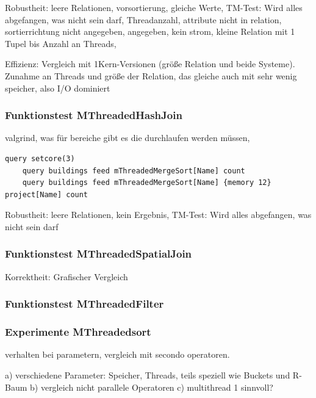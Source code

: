 \documentclass[a4paper,12pt,twoside]{article}
\begin{document}
Robustheit: leere Relationen, vorsortierung, gleiche Werte, TM-Test: Wird alles abgefangen, was nicht sein darf, Threadanzahl, attribute nicht in relation, sortierrichtung nicht angegeben, angegeben, kein strom, kleine Relation mit 1 Tupel bis Anzahl an Threads,


Effizienz: Vergleich mit 1Kern-Versionen (größe Relation und beide Systeme). Zunahme an Threads und größe der Relation, das gleiche auch mit sehr wenig speicher, also I/O dominiert

\subsubsection{Funktionstest MThreadedHashJoin}

valgrind, was für bereiche gibt es die durchlaufen werden müssen, 

\begin{minipage}{\linewidth}
	\begin{lstlisting}[caption={Beispiel Testqueries für den Sort-Operator}, label=list:testsort]
	query setcore(3)
	query buildings feed mThreadedMergeSort[Name] count
	query buildings feed mThreadedMergeSort[Name] {memory 12} project[Name] count
	\end{lstlisting}
\end{minipage}

Robustheit: leere Relationen, kein Ergebnis, TM-Test: Wird alles abgefangen, was nicht sein darf

\subsubsection{Funktionstest MThreadedSpatialJoin}

Korrektheit: Grafischer Vergleich

\subsubsection{Funktionstest MThreadedFilter}

\subsubsection{Experimente MThreadedsort}

verhalten bei parametern, vergleich mit secondo operatoren.

a) verschiedene Parameter: Speicher, Threads, teils speziell wie Buckets und R-Baum 
b) vergleich nicht parallele Operatoren
c) multithread 1 sinnvoll?
\end{document}
